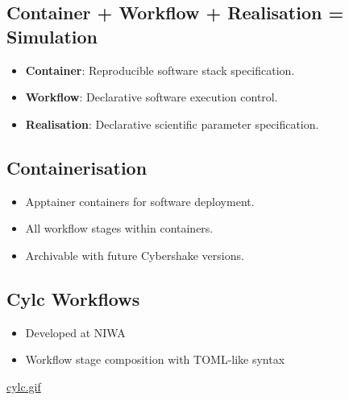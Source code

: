\documentclass[11pt]{article}
\begin{document}
\subsection*{Container + Workflow + Realisation = Simulation}
\label{sec:org6274222}
\begin{itemize}
\item \textbf{Container}: Reproducible software stack specification.
\item \textbf{Workflow}: Declarative software execution control.
\item \textbf{Realisation}: Declarative scientific parameter specification.
\end{itemize}
\subsection*{Containerisation}
\label{sec:orgdd131ca}
\begin{itemize}
\item Apptainer containers for software deployment.
\item All workflow stages within containers.
\item Archivable with future Cybershake versions.
\end{itemize}
\subsection*{Cylc Workflows}
\label{sec:org0eaa1b0}
\begin{itemize}
\item Developed at NIWA
\item Workflow stage composition with TOML-like syntax
\end{itemize}
\url{cylc.gif}
\end{document}
